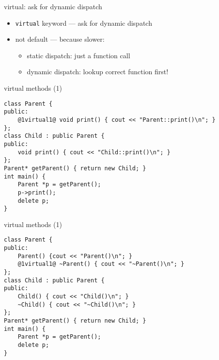 \begin{frame}{virtual: ask for dynamic dispatch}
    \begin{itemize}
    \item \texttt{virtual} keyword --- ask for dynamic dispatch
    \item not default --- because slower:
        \begin{itemize}
        \item static dispatch: just a function call
        \item dynamic dispatch: lookup correct function first!
        \end{itemize}
    \end{itemize}
\end{frame}

\begin{frame}[fragile,label=dynamicDispatchPrint]{virtual methods (1)}
\begin{lstlisting}
class Parent {
public:
    @1virtual1@ void print() { cout << "Parent::print()\n"; }
};
class Child : public Parent {
public:
    void print() { cout << "Child::print()\n"; }
};
Parent* getParent() { return new Child; }
int main() {
    Parent *p = getParent();
    p->print();
    delete p;
}
\end{lstlisting}
\end{frame}

\begin{frame}[fragile,label=dynDispatchDestroy]{virtual methods (1)}
\begin{lstlisting}
class Parent {
public:
    Parent() {cout << "Parent()\n"; }
    @1virtual1@ ~Parent() { cout << "~Parent()\n"; }
};
class Child : public Parent {
public:
    Child() { cout << "Child()\n"; }
    ~Child() { cout << "~Child()\n"; }
};
Parent* getParent() { return new Child; }
int main() {
    Parent *p = getParent();
    delete p;
}
\end{lstlisting}
\end{frame}

